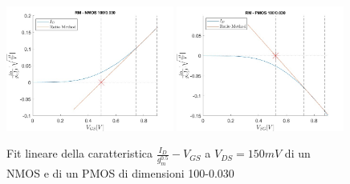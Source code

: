 \documentclass[12pt, letterpaper]{book}
\begin{document}
\begin{figure}[h!]
  \centering
  \includegraphics[width=0.49\textwidth]{RM-N4-100-30}
  \includegraphics[width=0.49\textwidth]{RM-P1-100-30}
  \caption{Fit lineare della caratteristica $\frac{I_D}{g_m^{0.5}}-V_{GS}$ a $V_{DS}=150mV$ di un NMOS e di un PMOS di dimensioni 100-0.030}
\end{figure}
\end{document}
